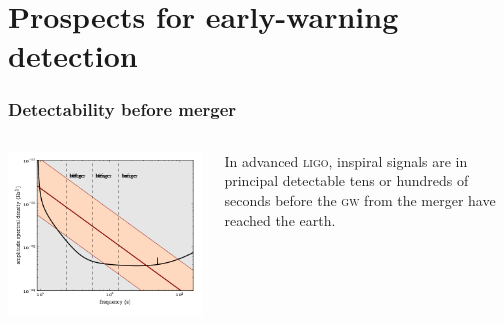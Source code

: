 \documentclass{beamer}
\begin{document}
\section{Prospects for early-warning detection}

\begin{frame}
	\frametitle{Detectability before merger}
	\begin{columns}
		\begin{column}{0.7\textwidth}
			\includegraphics[width=\textwidth]{figures/snr_psd}
		\end{column}
		\begin{column}{0.3\textwidth}
			In advanced \textsc{ligo}, inspiral signals are in principal detectable {\color{ink3}tens or hundreds of seconds} before the \textsc{gw} from the merger have reached the earth.
		\end{column}
	\end{columns}
\end{frame}
\end{document}
